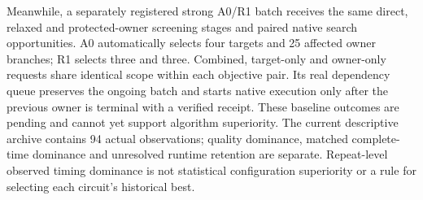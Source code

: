 Meanwhile, a separately registered strong A0/R1 batch receives the same direct, relaxed and protected-owner screening stages and paired native search opportunities. A0 automatically selects four targets and 25 affected owner branches; R1 selects three and three. Combined, target-only and owner-only requests share identical scope within each objective pair. Its real dependency queue preserves the ongoing batch and starts native execution only after the previous owner is terminal with a verified receipt. These baseline outcomes are pending and cannot yet support algorithm superiority. The current descriptive archive contains 94 actual observations; quality dominance, matched complete-time dominance and unresolved runtime retention are separate. Repeat-level observed timing dominance is not statistical configuration superiority or a rule for selecting each circuit's historical best.
